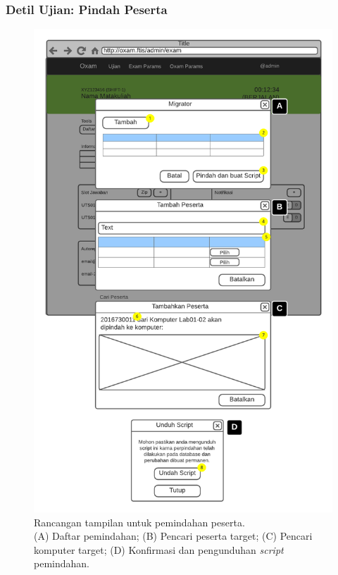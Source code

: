 \subsubsection{Detil Ujian: Pindah Peserta}
    \begin{figure}
        \centering
        \includegraphics[height=0.7\paperheight]{Gambar/mockups/Mockup--Admin - Pindah Peserta.pdf}
        \caption{Rancangan tampilan untuk pemindahan peserta. \\
            (A) Daftar pemindahan; (B) Pencari peserta target; (C) Pencari
            komputer target; (D) Konfirmasi dan pengunduhan \textit{script}
            pemindahan.}
        \label{fig:mockup_admin_exam_det_migrator}
    \end{figure}
    
